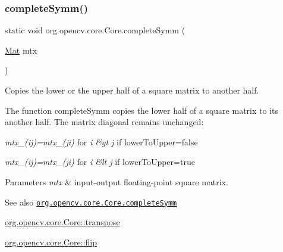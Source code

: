 \subsubsection{\texorpdfstring{complete\+Symm()}{completeSymm()}\hspace{0.1cm}{\footnotesize\ttfamily [2/2]}}
{\footnotesize\ttfamily static void org.\+opencv.\+core.\+Core.\+complete\+Symm (\begin{DoxyParamCaption}\item[{\mbox{\hyperlink{classorg_1_1opencv_1_1core_1_1_mat}{Mat}}}]{mtx }\end{DoxyParamCaption})\hspace{0.3cm}{\ttfamily [static]}}

Copies the lower or the upper half of a square matrix to another half.

The function {\ttfamily complete\+Symm} copies the lower half of a square matrix to its another half. The matrix diagonal remains unchanged\+:


\begin{DoxyItemize}
\item {\itshape mtx\+\_\+(ij)=mtx\+\_\+(ji)} for {\itshape i \&gt j} if {\ttfamily lower\+To\+Upper=false} 
\item {\itshape mtx\+\_\+(ij)=mtx\+\_\+(ji)} for {\itshape i \&lt j} if {\ttfamily lower\+To\+Upper=true} 
\end{DoxyItemize}


\begin{DoxyParams}{Parameters}
{\em mtx} & input-\/output floating-\/point square matrix.\\
\hline
\end{DoxyParams}
\begin{DoxySeeAlso}{See also}
\href{http://docs.opencv.org/modules/core/doc/operations_on_arrays.html#completesymm}{\tt org.\+opencv.\+core.\+Core.\+complete\+Symm} 

\mbox{\hyperlink{classorg_1_1opencv_1_1core_1_1_core_a4536de6a43f5dfb4d4ba1bf24735696a}{org.\+opencv.\+core.\+Core\+::transpose}} 

\mbox{\hyperlink{classorg_1_1opencv_1_1core_1_1_core_a8dc68bbfca84b4fdfb9cd7bd79fc893e}{org.\+opencv.\+core.\+Core\+::flip}} 
\end{DoxySeeAlso}
\mbox{\label{classorg_1_1opencv_1_1core_1_1_core_a42f107c63200e26f87ddb11631980be7}} 
